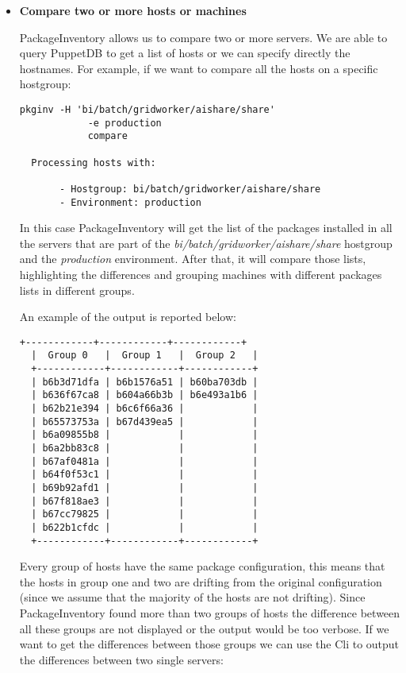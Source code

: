\begin{itemize}
  \item \textbf{Compare two or more hosts or machines}

  PackageInventory allows us to compare two or more servers. We are able
  to query PuppetDB to get a list of hosts or we can specify directly the
  hostnames. For example, if we want to compare all the hosts on
  a specific hostgroup:
  
  \begin{lstlisting}[frame=single]
  pkginv -H 'bi/batch/gridworker/aishare/share'
            -e production
            compare
  
  Processing hosts with:
  
       - Hostgroup: bi/batch/gridworker/aishare/share
       - Environment: production
  \end{lstlisting}

  In this case PackageInventory will get the list of the packages
  installed in all the servers that are part of the
  \textit{bi/batch/gridworker/aishare/share} hostgroup and the
  \textit{production} environment. After that, it will compare those
  lists, highlighting the differences and grouping machines with different
  packages lists in different groups.

  An example of the output is reported below:

  \begin{lstlisting}[frame=single]
  +------------+------------+------------+
  |  Group 0   |  Group 1   |  Group 2   |
  +------------+------------+------------+
  | b6b3d71dfa | b6b1576a51 | b60ba703db |
  | b636f67ca8 | b604a66b3b | b6e493a1b6 |
  | b62b21e394 | b6c6f66a36 |            |
  | b65573753a | b67d439ea5 |            |
  | b6a09855b8 |            |            |
  | b6a2bb83c8 |            |            |
  | b67af0481a |            |            |
  | b64f0f53c1 |            |            |
  | b69b92afd1 |            |            |
  | b67f818ae3 |            |            |
  | b67cc79825 |            |            |
  | b622b1cfdc |            |            |
  +------------+------------+------------+
  \end{lstlisting}

  Every group of hosts have the same package configuration, this means
  that the hosts in group one and two are drifting from the original
  configuration (since we assume that the majority of the hosts are not
  drifting). Since PackageInventory found more than two groups of hosts
  the difference between all these groups are not displayed or the output
  would be too verbose. If we want to get the differences between those
  groups we can use the Cli to output the differences between two single
  servers:


\end{itemize}
